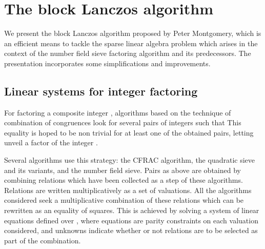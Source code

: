 \def\bfv{\mathbf{v}}
\def\bfc{\mathbf{c}}
\def\bfp{\mathbf{p}}
\def\bfw{\mathbf{w}}
\def\bft{\mathbf{t}}
\def\bfd{\mathbf{d}}
\def\bfX{\mathbf{X}}
\def\bfS{\mathbf{S}}
\def\bfx{\mathbf{x}}
\def\bfSigma{\mathbf{\Sigma}}
\def\bfdelta{\mathbf{\delta}}
\def\bfDelta{\mathbf{\Delta}}
\def\cO{\mathop{\mathcal{O}}}
\def\barmatrix#1#2#3#4{\left(\begin{array}{c|c}#1&#2\\\hline#3&#4\end{array}\right)}
\def\barvector#1#2{\left(\begin{array}{c|c}#1&#2\end{array}\right)}


\ifx\thechapter\undefined\else

\author{\ChapSevenAuthorOne}

\chapterauthor{\ChapSevenAuthorOne}

\setcounter{chapter}{6}


\chapter{The block Lanczos algorithm}\label{chap7:blocklanczos}

\contributor{\ChapSevenAuthorOne
\affiliation{\ChapSevenAuthorOneAffiliation}}


We present the block Lanczos algorithm proposed by Peter Montgomery,
which is an efficient means to tackle the sparse linear algebra problem which
arises in the context of the number field sieve factoring algorithm and
its predecessors. The presentation incorporates some
simplifications and improvements.

\fi

\section{Linear systems for integer factoring}
\label{sec:blocklanczos:intro}

For factoring a composite integer , algorithms based on the technique
of combination of congruences look for several pairs of integers 
such that  This equality is hoped to be non
trivial for at least one of the obtained pairs, letting 
unveil a factor of the integer .

Several algorithms use this strategy: the CFRAC algorithm,  the
quadratic sieve and its variants, and the number field sieve. Pairs
 as above are obtained by combining relations which have been collected
as a step of these algorithms. Relations are written multiplicatively as
a set of valuations. All the algorithms considered seek a multiplicative
combination of these relations which can be rewritten as an equality of
squares. This is achieved by solving a system of linear equations defined
over , where equations are parity constraints on each valuation
considered, and unknowns indicate whether or not relations are to be
selected as part of the combination.


